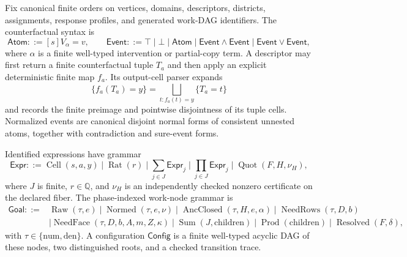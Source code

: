 Fix canonical finite orders on vertices, domains, descriptors, districts, assignments, response profiles, and generated work-DAG identifiers.  The counterfactual syntax is
\[
\mathsf{Atom}::=[s]V_\alpha=v,
\qquad
\mathsf{Event}::=\top\mid\bot\mid\mathsf{Atom}
\mid\mathsf{Event}\wedge\mathsf{Event}
\mid\mathsf{Event}\vee\mathsf{Event},
\]
where \(\alpha\) is a finite well-typed intervention or partial-copy term.  A descriptor may first return a finite counterfactual tuple \(T_a\) and then apply an explicit deterministic finite map \(f_a\).  Its output-cell parser expands
\[
\{f_a(T_a)=y\}=\bigsqcup_{t:f_a(t)=y}\{T_a=t\}
\tag{1}
\]
and records the finite preimage and pointwise disjointness of its tuple cells.  Normalized events are canonical disjoint normal forms of consistent unnested atoms, together with contradiction and sure-event forms.

Identified expressions have grammar
\[
\mathsf{Expr}::=\operatorname{Cell}(s,a,y)\mid\operatorname{Rat}(r)
\mid\sum_{j\in J}\mathsf{Expr}_j
\mid\prod_{j\in J}\mathsf{Expr}_j
\mid\operatorname{Quot}(F,H,\nu_H),
\]
where \(J\) is finite, \(r\in\mathbb Q\), and \(\nu_H\) is an independently checked nonzero certificate on the declared fiber.  The phase-indexed work-node grammar is
\[
\begin{split}
\mathsf{Goal}::={}&\operatorname{Raw}(\tau,e)
\mid\operatorname{Normed}(\tau,e,\nu)
\mid\operatorname{AncClosed}(\tau,H,e,\alpha)
\mid\operatorname{NeedRows}(\tau,D,b)\\
&\mid\operatorname{NeedFace}(\tau,D,b,A,m,Z,\kappa)
\mid\operatorname{Sum}(J,\mathrm{children})
\mid\operatorname{Prod}(\mathrm{children})
\mid\operatorname{Resolved}(F,\delta),
\end{split}
\]
with \(\tau\in\{\mathrm{num},\mathrm{den}\}\).  A configuration \(\mathsf{Config}\) is a finite well-typed acyclic DAG of these nodes, two distinguished roots, and a checked transition trace.

